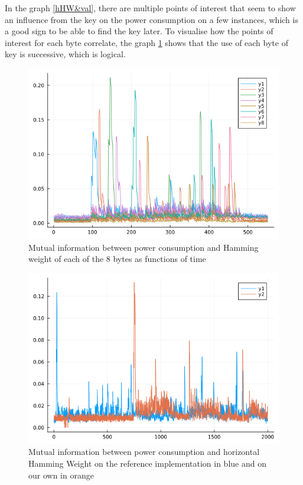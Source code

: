 \documentclass[a4paper,11pt,twocolumn]{article}
\begin{document}
		In the graph \ref{hHW&val}, there are multiple points of interest that seem to show an influence from the key on the power consumption on a few instances, which is a good sign to be able to find the key later. To visualise how the points of interest for each byte correlate, the graph \ref{hHW8_zoom} shows that the use of each byte of key is successive, which is logical. 
		
		\begin{figure}[h]
			\centering
			\includegraphics[scale=0.3]{hHW_8_bytes_zoom}
			\caption{Mutual information between power consumption and Hamming weight of each of the 8 bytes as functions of time}
			\label{hHW8_zoom}
		\end{figure}

		\begin{figure}[h]
			\centering
			\includegraphics[scale=0.3]{comp_ref_hHW}
			\caption{Mutual information between power consumption and horizontal Hamming Weight on the reference implementation in blue and on our own in orange}
			\label{compref}
		\end{figure}
		
\end{document}
